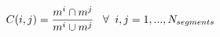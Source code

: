 \vspace{-0.1cm}
\begin{equation}
    C(i, j) = \frac{m^i \cap m^j}{m^i \cup m^j} \;\;\; \forall \;\; i,j = 1, ... , N_{segments}
    \label{eq:forward-pass}
    \vspace{-0.05cm}
\end{equation}